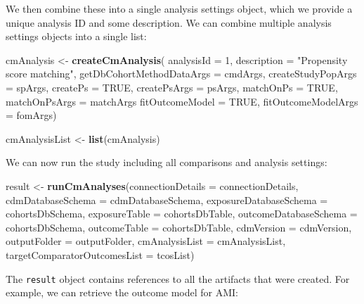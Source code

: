 \documentclass[11pt]{book}
\newenvironment{Shaded}{\begin{snugshade}}{\end{snugshade}}
\newcommand{\KeywordTok}[1]{\textcolor[rgb]{0.13,0.29,0.53}{\textbf{#1}}}
\newcommand{\DataTypeTok}[1]{\textcolor[rgb]{0.13,0.29,0.53}{#1}}
\newcommand{\DecValTok}[1]{\textcolor[rgb]{0.00,0.00,0.81}{#1}}
\newcommand{\StringTok}[1]{\textcolor[rgb]{0.31,0.60,0.02}{#1}}
\newcommand{\OtherTok}[1]{\textcolor[rgb]{0.56,0.35,0.01}{#1}}
\newcommand{\NormalTok}[1]{#1}
\begin{document}
We then combine these into a single analysis settings object, which we
provide a unique analysis ID and some description. We can combine
multiple analysis settings objects into a single list:

\begin{Shaded}
\begin{Highlighting}[]
\NormalTok{cmAnalysis <-}\StringTok{ }\KeywordTok{createCmAnalysis}\NormalTok{(}
  \DataTypeTok{analysisId =} \DecValTok{1}\NormalTok{,}
  \DataTypeTok{description =} \StringTok{"Propensity score matching"}\NormalTok{,}
  \DataTypeTok{getDbCohortMethodDataArgs =}\NormalTok{ cmdArgs,}
  \DataTypeTok{createStudyPopArgs =}\NormalTok{ spArgs,}
  \DataTypeTok{createPs =} \OtherTok{TRUE}\NormalTok{,}
  \DataTypeTok{createPsArgs =}\NormalTok{ psArgs,}
  \DataTypeTok{matchOnPs =} \OtherTok{TRUE}\NormalTok{,}
  \DataTypeTok{matchOnPsArgs =}\NormalTok{ matchArgs}
  \DataTypeTok{fitOutcomeModel =} \OtherTok{TRUE}\NormalTok{,}
  \DataTypeTok{fitOutcomeModelArgs =}\NormalTok{ fomArgs)}

\NormalTok{cmAnalysisList <-}\StringTok{ }\KeywordTok{list}\NormalTok{(cmAnalysis)}
\end{Highlighting}
\end{Shaded}

We can now run the study including all comparisons and analysis
settings:

\begin{Shaded}
\begin{Highlighting}[]
\NormalTok{result <-}\StringTok{ }\KeywordTok{runCmAnalyses}\NormalTok{(}\DataTypeTok{connectionDetails =}\NormalTok{ connectionDetails,}
                        \DataTypeTok{cdmDatabaseSchema =}\NormalTok{ cdmDatabaseSchema,}
                        \DataTypeTok{exposureDatabaseSchema =}\NormalTok{ cohortsDbSchema,}
                        \DataTypeTok{exposureTable =}\NormalTok{ cohortsDbTable,}
                        \DataTypeTok{outcomeDatabaseSchema =}\NormalTok{ cohortsDbSchema,}
                        \DataTypeTok{outcomeTable =}\NormalTok{ cohortsDbTable,}
                        \DataTypeTok{cdmVersion =}\NormalTok{ cdmVersion,}
                        \DataTypeTok{outputFolder =}\NormalTok{ outputFolder,}
                        \DataTypeTok{cmAnalysisList =}\NormalTok{ cmAnalysisList,}
                        \DataTypeTok{targetComparatorOutcomesList =}\NormalTok{ tcosList)}
\end{Highlighting}
\end{Shaded}

The \texttt{result} object contains references to all the artifacts that
were created. For example, we can retrieve the outcome model for AMI:
\end{document}
